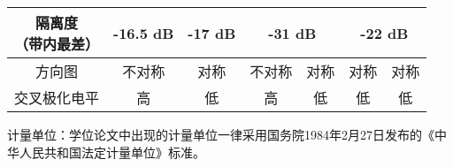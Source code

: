 $$\begin{table}
\begin{tabular}{|c|c|c|c|c|c|c|}
\hline
\makecell[c]{隔离度\\（带内最差）} & -16.5 dB & -17 dB & \multicolumn{2}{c|}{-31 dB} & \multicolumn{2}{c|}{-22 dB} \\
\hline
方向图 & 不对称 & 对称 & 不对称 & 对称 & 对称 & 对称 \\
\hline
交叉极化电平 & 高 & 低 & 高 & 低 & 低 &低 \\
\hline
\end{tabular}
\end{table}
\par
计量单位：学位论文中出现的计量单位一律采用国务院1984年2月27日发布的《中华人民共和国法定计量单位》标准。
